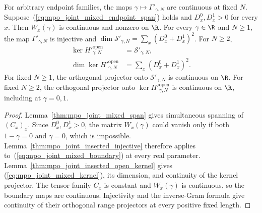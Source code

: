\begin{lemma}
    \label{thm:mpo_joint_mixed_open_kernel}
    \leanok
    For arbitrary endpoint families, the maps
    $\gamma\mapsto\Gamma'_{\gamma,N}$ are continuous at fixed $N$.
    Suppose~(\ref{eq:mpo_joint_mixed_endpoint_span}) holds and
    $D_x^0,D_x^1>0$ for every $x$.
    Then $W_x(\gamma)$ is continuous and nonzero on $\R$.
    For every $\gamma\in\R$ and $N\geq1$, the map
    $\Gamma'_{\gamma,N}$ is injective and
    $\dim\mathcal S'_{\gamma,N}=\sum_x(D_x^0+D_x^1)^2$.
    For $N\geq2$,
    \begin{align}
        \ker H'^{\mathrm{open}}_{\gamma,N}
         & =\mathcal S'_{\gamma,N},
        \label{eq:mpo_joint_mixed_kernel} \\
        \dim\ker H'^{\mathrm{open}}_{\gamma,N}
         & =\sum_x(D_x^0+D_x^1)^2.
    \end{align}
    For fixed $N\geq1$, the orthogonal projector onto
    $\mathcal S'_{\gamma,N}$ is continuous on $\R$.
    For fixed $N\geq2$, the orthogonal projector onto
    $\ker H'^{\mathrm{open}}_{\gamma,N}$ is continuous on $\R$,
    including at $\gamma=0,1$.
\end{lemma}
\begin{proof}
    \leanok
    Lemma~\ref{thm:mpo_joint_mixed_span} gives simultaneous spanning
    of $(C_x)_x$. Since $D_x^0,D_x^1>0$, the matrix $W_x(\gamma)$
    could vanish only if both $1-\gamma=0$ and $\gamma=0$, which is
    impossible. Lemma~\ref{thm:mpo_joint_inserted_injective} therefore
    applies to~(\ref{eq:mpo_joint_mixed_boundary}) at every real parameter.
    Lemma~\ref{thm:mpo_joint_inserted_open_kernel} gives
    (\ref{eq:mpo_joint_mixed_kernel}), its dimension, and continuity of
    the kernel projector. The tensor family $C_x$ is constant and
    $W_x(\gamma)$ is continuous, so the boundary maps are continuous.
    Injectivity and the inverse-Gram formula give continuity of their
    orthogonal range projectors at every positive fixed length.
\end{proof}

